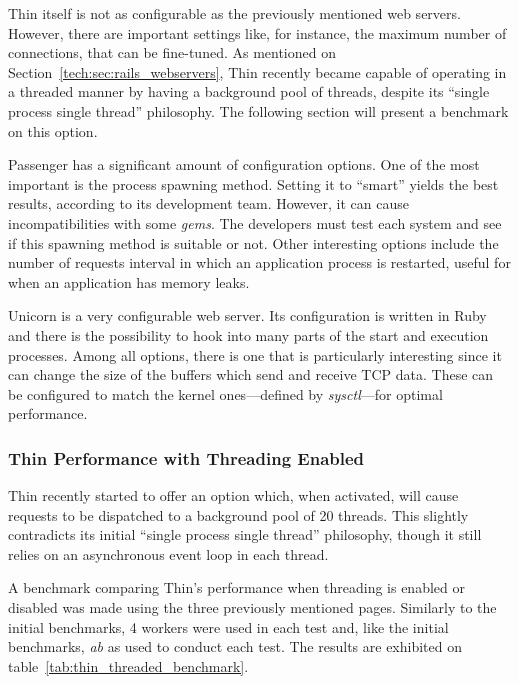 Thin itself is not as configurable as the previously mentioned web servers. However, there are important settings like, for instance, the maximum number of connections, that can be fine-tuned. As mentioned on Section~\ref{tech:sec:rails_webservers}, Thin recently became capable of operating in a threaded manner by having a background pool of threads, despite its ``single process single thread'' philosophy. The following section will present a benchmark on this option.

Passenger has a significant amount of configuration options. One of the most important is the process spawning method. Setting it to ``smart'' yields the best results, according to its development team. However, it can cause incompatibilities with some \textit{gems}. The developers must test each system and see if this spawning method is suitable or not. Other interesting options include the number of requests interval in which an application process is restarted, useful for when an application has memory leaks.

Unicorn is a very configurable web server. Its configuration is written in Ruby and there is the possibility to hook into many parts of the start and execution processes. Among all options, there is one that is particularly interesting since it can change the size of the buffers which send and receive TCP data. These can be configured to match the kernel ones---defined by \textit{sysctl}---for optimal performance.

\subsubsection{Thin Performance with Threading Enabled}
Thin recently started to offer an option which, when activated, will cause requests to be dispatched to a background pool of 20 threads. This slightly contradicts its initial ``single process single thread'' philosophy, though it still relies on an asynchronous event loop in each thread.

A benchmark comparing Thin's performance when threading is enabled or disabled was made using the three previously mentioned pages. Similarly to the initial benchmarks, 4 workers were used in each test and, like the initial benchmarks, \textit{ab} as used to conduct each test. The results are exhibited on table~\ref{tab:thin_threaded_benchmark}.

